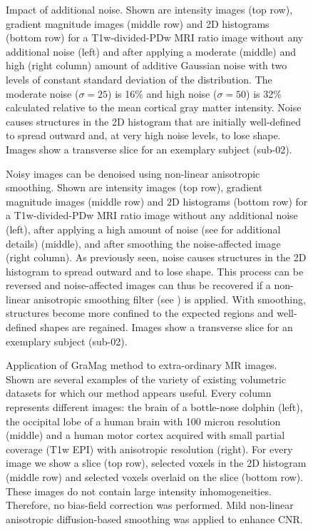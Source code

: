 \begin{figure}[htbp!]
\centering
\caption{Impact of additional noise. Shown are intensity images (top row), gradient magnitude images (middle row) and 2D histograms (bottom row) for a T1w-divided-PDw MRI ratio image without any additional noise (left) and after applying a moderate (middle) and high (right column) amount of additive Gaussian noise with two levels of constant standard deviation of the distribution. The moderate noise ($\sigma=25$) is 16\% and high noise ($\sigma=50$) is 32\% calculated relative to the mean cortical gray matter intensity. Noise causes structures in the 2D histogram that are initially well-defined to spread outward and, at very high noise levels, to lose shape. Images show a transverse slice for an exemplary subject (sub-02).}
\label{S2_Fig}
\end{figure}

\begin{figure}[htbp!]
\centering
\caption{Noisy images can be denoised using non-linear anisotropic smoothing. Shown are intensity images (top row), gradient magnitude images (middle row) and 2D histograms (bottom row) for a T1w-divided-PDw MRI ratio image without any additional noise (left), after applying a high amount of noise (see  for additional details) (middle), and after smoothing the noise-affected image (right column). As previously seen, noise causes structures in the 2D histogram to spread outward and to lose shape. This process can be reversed and noise-affected images can thus be recovered if a non-linear anisotropic smoothing filter (see \parencite{Weickert1998}) is applied. With smoothing, structures become more confined to the expected regions and well-defined shapes are regained. Images show a transverse slice for an exemplary subject (sub-02).}
\label{S5_Fig}
\end{figure}

\begin{figure}[htbp!]
\centering
\caption{Application of GraMag method to extra-ordinary MR images. Shown are several examples of the variety of existing volumetric datasets for which our method appears useful. Every column represents different images: the brain of a bottle-nose dolphin \parencite{Toro2014} (left), the occipital lobe of a human brain with 100 micron resolution \parencite{Amunts2013} (middle) and a human motor cortex acquired with small partial coverage (T1w EPI) with anisotropic resolution \parencite{Huber2017} (right). For every image we show a slice (top row), selected voxels in the 2D histogram (middle row) and selected voxels overlaid on the slice (bottom row). These images do not contain large intensity inhomogeneities. Therefore, no bias-field correction was performed. Mild non-linear anisotropic diffusion-based smoothing was applied to enhance CNR.}
\label{S6_Fig}
\end{figure}

